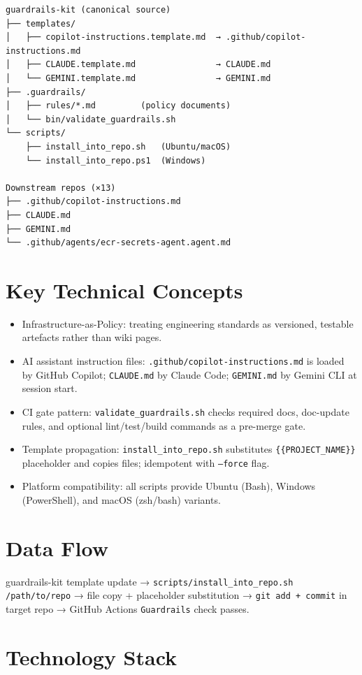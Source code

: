 \documentclass[11pt,a4paper]{article}
\begin{document}
\begin{verbatim}
guardrails-kit (canonical source)
├── templates/
│   ├── copilot-instructions.template.md  → .github/copilot-instructions.md
│   ├── CLAUDE.template.md                → CLAUDE.md
│   └── GEMINI.template.md                → GEMINI.md
├── .guardrails/
│   ├── rules/*.md         (policy documents)
│   └── bin/validate_guardrails.sh
└── scripts/
    ├── install_into_repo.sh   (Ubuntu/macOS)
    └── install_into_repo.ps1  (Windows)

Downstream repos (×13)
├── .github/copilot-instructions.md
├── CLAUDE.md
├── GEMINI.md
└── .github/agents/ecr-secrets-agent.agent.md
\end{verbatim}


\section{Key Technical Concepts}
\begin{itemize}[leftmargin=1.5em]
  \item Infrastructure-as-Policy: treating engineering standards as versioned, testable artefacts rather than wiki pages.
  \item AI assistant instruction files: \texttt{.github/copilot-instructions.md} is loaded by GitHub Copilot; \texttt{CLAUDE.md} by Claude Code; \texttt{GEMINI.md} by Gemini CLI at session start.
  \item CI gate pattern: \texttt{validate\_guardrails.sh} checks required docs, doc-update rules, and optional lint/test/build commands as a pre-merge gate.
  \item Template propagation: \texttt{install\_into\_repo.sh} substitutes \texttt{\{\{PROJECT\_NAME\}\}} placeholder and copies files; idempotent with \texttt{--force} flag.
  \item Platform compatibility: all scripts provide Ubuntu (Bash), Windows (PowerShell), and macOS (zsh/bash) variants.
\end{itemize}

\section{Data Flow}

guardrails-kit template update →
\texttt{scripts/install\_into\_repo.sh /path/to/repo} →
file copy + placeholder substitution →
\texttt{git add + commit} in target repo →
GitHub Actions \texttt{Guardrails} check passes.


\section{Technology Stack}
\end{document}
